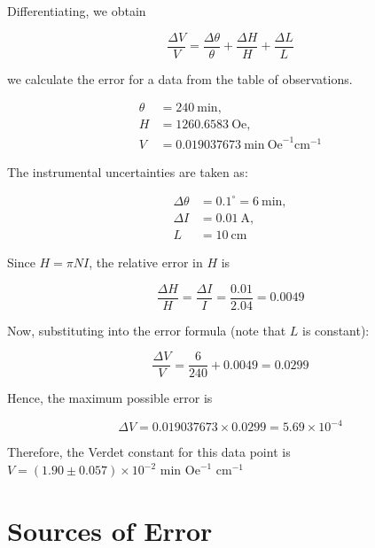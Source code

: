 Differentiating, we obtain

\begin{equation}
\boxed{\frac{\Delta V}{V}
=
\frac{\Delta \theta}{\theta}
+
\frac{\Delta H}{H}
+
\frac{\Delta L}{L}}
\end{equation}

we calculate the error for a data from the table of observations.

\begin{align*}
\theta &= 240 \ \text{min}, \\
H &= 1260.6583 \ \text{Oe}, \\
V &= 0.019037673 \ \text{min}\ \text{Oe}^{-1}\text{cm}^{-1}
\end{align*}

The instrumental uncertainties are taken as:

\begin{align*}
\Delta \theta &= 0.1^\circ = 6 \ \text{min}, \\
\Delta I &= 0.01 \ \text{A}, \\
L &= 10 \ \text{cm}
\end{align*}

Since $H = \pi N I$, the relative error in $H$ is

\begin{equation}
\frac{\Delta H}{H} = \frac{\Delta I}{I} = \frac{0.01}{2.04} = 0.0049
\end{equation}

Now, substituting into the error formula (note that $L$ is constant):

\begin{equation}
\frac{\Delta V}{V}
=
\frac{6}{240}
+
0.0049 = 0.0299
\end{equation}

Hence, the maximum possible error is

\begin{equation}
\Delta V = 0.019037673 \times 0.0299
= 5.69 \times 10^{-4}
\end{equation}

Therefore, the Verdet constant for this data point is $V = (1.90 \pm 0.057)\times 10^{-2} \text{ min Oe}^{-1} \text{ cm}^{-1}$

\section{Sources of Error}

